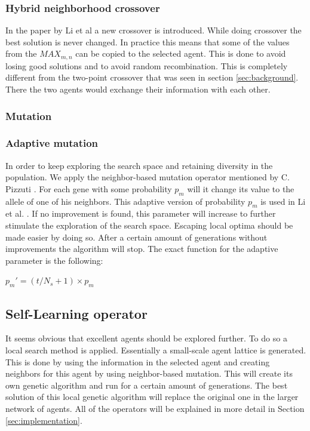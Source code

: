 \subsubsection{Hybrid neighborhood crossover}
In the paper by Li et al \cite{Li2016} a new crossover is introduced.
While doing crossover the best solution is never changed.
In practice this means that some of the values from the $MAX_{m,n}$ can be copied to the selected agent.
This is done to avoid losing good solutions and to avoid random recombination.
This is completely different from the two-point crossover that was seen in section \ref{sec:background}.
There the two agents would exchange their information with each other. 


\subsubsection{Mutation}
\subsubsection*{Adaptive mutation}
In order to keep exploring the search space and retaining diversity in the population. We apply the neighbor-based mutation operator mentioned by C. Pizzuti \cite{Pizzuti2012}.
For each gene with some probability $p_{m}$ will it change its value to the allele of one of his neighbors.
This adaptive version of probability $p_{m}$ is used in Li et al. \cite{Li2016}.
If no improvement is found, this parameter will increase to further stimulate the exploration of the search space.
Escaping local optima should be made easier by doing so.
After a certain amount of generations without improvements the algorithm will stop.
The exact function for the adaptive parameter is the following: \\
\begin{center}
$p_{m}' = (t/N_{s} + 1) \times p_{m}$
\end{center}

\subsection*{Self-Learning operator}
It seems obvious that excellent agents should be explored further.
To do so a local search method is applied.
Essentially a small-scale agent lattice is generated.
This is done by using the information in the selected agent and creating neighbors for this agent by using neighbor-based mutation.
This will create its own genetic algorithm and run for a certain amount of generations.
The best solution of this local genetic algorithm will replace the original one in the larger network  of agents.
All of the operators will be explained in more detail in Section \ref{sec:implementation}.

